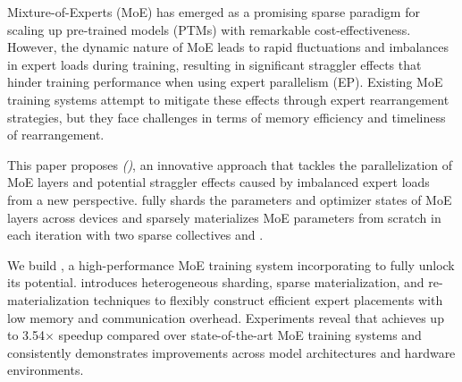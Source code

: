 Mixture-of-Experts (MoE) has emerged as a promising sparse paradigm for scaling up pre-trained models (PTMs) with remarkable cost-effectiveness.
However, the dynamic nature of MoE leads to rapid fluctuations and imbalances in expert loads during training, resulting in significant straggler effects that hinder training performance when using expert parallelism (EP).
Existing MoE training systems attempt to mitigate these effects through expert rearrangement strategies, but they face challenges in terms of memory efficiency and timeliness of rearrangement.

This paper proposes \textit{\YYY (\yyy)}, an innovative approach that tackles the parallelization of MoE layers and potential straggler effects caused by imbalanced expert loads from a new perspective.
\yyy fully shards the parameters and optimizer states of MoE layers across devices and sparsely materializes MoE parameters from scratch in each iteration with two sparse collectives \collsag and \collsrs.

We build \xxx, a high-performance MoE training system incorporating \yyy to fully unlock its potential.
\xxx introduces heterogeneous sharding, sparse materialization, and re-materialization techniques to flexibly construct efficient expert placements with low memory and communication overhead.
Experiments reveal that \xxx achieves up to 3.54$\times$ speedup compared over state-of-the-art MoE training systems and consistently demonstrates improvements across model architectures and hardware environments.
